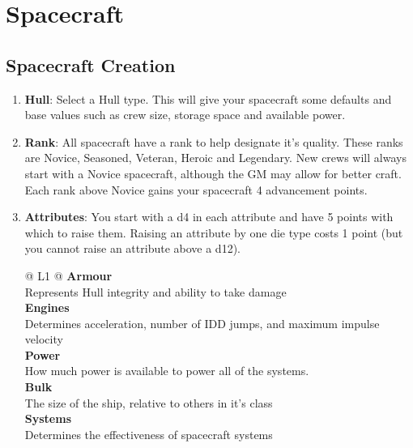 
\section{Spacecraft}

\begin{multicols}{2}

\subsection{Spacecraft Creation}

\begin{enumerate}

  \item \textbf{Hull}: Select a Hull type. This will give your spacecraft some defaults and base values such as crew size, storage space and available power.
  
  \item \textbf{Rank}: All spacecraft have a rank to help designate it's quality. These ranks are Novice, Seasoned, Veteran, Heroic and Legendary. New crews will always start with a Novice spacecraft, although the GM may allow for better craft. Each rank above Novice gains your spacecraft 4 advancement points.

  \item \textbf{Attributes}: You start with a d4 in each attribute and have 5 points with which to raise them. Raising an attribute by one die type costs 1 point (but you cannot raise an attribute above a d12).

  \begin{redtable}{\linewidth}{ @{} L{1} @{}}
    \textbf{Armour}\\
    Represents Hull integrity and ability to take damage\\
    \textbf{Engines}\\
    Determines acceleration, number of IDD jumps, and maximum impulse velocity\\
    \textbf{Power}\\
    How much power is available to power all of the systems.\\
    \textbf{Bulk}\\
    The size of the ship, relative to others in it's class\\
    \textbf{Systems}\\
    Determines the effectiveness of spacecraft systems\\
  \end{redtable}


\end{enumerate}
\end{multicols}
